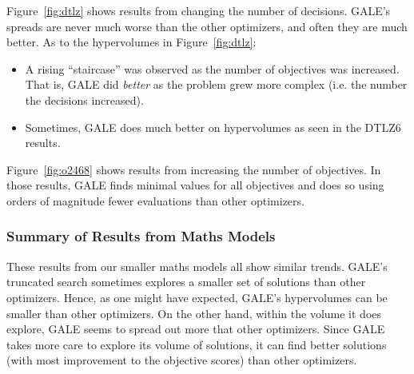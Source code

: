 \documentclass[10pt,journal,compsoc]{IEEEtran}
\newcommand{\bi}{\begin{itemize}}
\newcommand{\ei}{\end{itemize}}
\newcommand{\fig}[1]{Figure~\ref{fig:#1}}
\newenvironment{changed}{\par}{\par}
\begin{document}
\begin{changed}
\fig{dtlz} shows results from changing the number of decisions.
GALE's spreads are never much worse than the other
optimizers, and often they are much
better. 
As to the hypervolumes in  \fig{dtlz}:
\bi
\item
A rising ``staircase'' was observed as the number of
objectives was increased. That is,  GALE did {\em better}
as the problem grew more complex (i.e. the number the decisions increased).
\item
Sometimes, GALE does much better on hypervolumes as
seen in the DTLZ6 results.
\ei
\fig{o2468} shows results from increasing the
number of objectives. 
In those results,   GALE 
finds minimal values for all objectives and does
so using  orders of magnitude fewer evaluations than
 other optimizers.




\subsubsection{Summary of Results from Maths Models}

These results from our smaller maths models all show similar trends.
GALE's truncated search sometimes explores a
smaller set of solutions than other
optimizers.  Hence, as one might have expected, GALE's hypervolumes can be smaller than other optimizers. On the other hand,
within the volume it does explore, GALE seems to spread
out more that other optimizers.
Since GALE takes more care to explore its volume of solutions,
it can find better solutions (with most improvement to the objective scores)
than other optimizers.
\end{changed}

\end{document}
